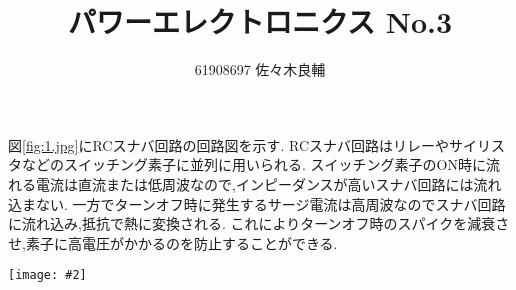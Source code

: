 \documentclass[uplatex,a4j,11pt,dvipdfmx]{jsarticle}
\makeatletter
\def\fgcaption{\def\@captype{figure}\caption}
\newcommand{\mfig}[3][width=15cm]{
\begin{center}
\texttt{[image: \#2]}
\fgcaption{#3 \label{fig:#2}}
\end{center}
}
\makeatother
\begin{document}
\title{パワーエレクトロニクス No.3}
\author{61908697 佐々木良輔}
\date{}
\maketitle
図\ref{fig:1.jpg}にRCスナバ回路の回路図を示す.
RCスナバ回路はリレーやサイリスタなどのスイッチング素子に並列に用いられる.
スイッチング素子のON時に流れる電流は直流または低周波なので,インピーダンスが高いスナバ回路には流れ込まない.
一方でターンオフ時に発生するサージ電流は高周波なのでスナバ回路に流れ込み,抵抗で熱に変換される.
これによりターンオフ時のスパイクを減衰させ,素子に高電圧がかかるのを防止することができる.\cite{RC}
\mfig[width=6cm]{1.jpg}{RCスナバ回路}

\end{document}

